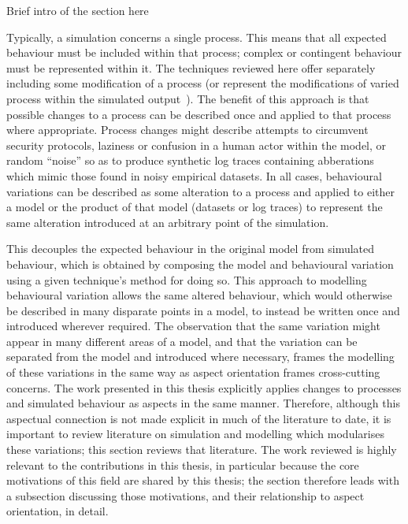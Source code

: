 
Brief intro of the section here


Typically, a simulation concerns a single process. This means that all expected
behaviour must be included within that process; complex or contingent behaviour
must be represented within it. The techniques reviewed here offer separately
including some modification of a process (or represent the modifications of
varied process within the simulated
output~\cite{stocker2013secsy,stocker2014secsy}). The benefit of this approach
is that possible changes to a process can be described once and applied to that
process where appropriate. Process changes might describe attempts to circumvent
security protocols, laziness or confusion in a human actor within the model, or
random ``noise'' so as to produce synthetic log traces containing abberations
which mimic those found in noisy empirical datasets. In all cases, behavioural
variations can be described as some alteration to a process and applied to
either a model or the product of that model (datasets or log traces) to
represent the same alteration introduced at an arbitrary point of the
simulation.

This decouples the expected behaviour in the original model from simulated
behaviour, which is obtained by composing the model and behavioural variation
using a given technique's method for doing so. This approach to modelling
behavioural variation allows the same altered behaviour, which would otherwise
be described in many disparate points in a model, to instead be written once and
introduced wherever required. The observation that the same variation might
appear in many different areas of a model, and that the variation can be
separated from the model and introduced where necessary, frames the modelling of
these variations in the same way as aspect orientation frames cross-cutting
concerns. The work presented in this thesis explicitly applies changes to
processes and simulated behaviour as aspects in the same manner. Therefore,
although this aspectual connection is not made explicit in much of the
literature to date, it is important to review literature on simulation and
modelling which modularises these variations; this section reviews that
literature. The work reviewed is highly relevant to the contributions in this
thesis, in particular because the core motivations of this field are shared by
this thesis; the section therefore leads with a subsection discussing those
motivations, and their relationship to aspect orientation, in detail.



